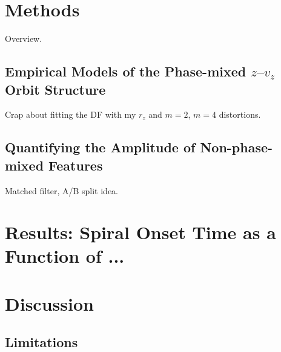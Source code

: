 

\section{Methods} \label{sec:methods}

Overview.

\subsection{Empirical Models of the Phase-mixed $z$--$v_z$ Orbit Structure}
\label{sec:zvz-structure}

Crap about fitting the DF with my $r_z$ and $m=2$, $m=4$ distortions.


\subsection{Quantifying the Amplitude of Non-phase-mixed Features}
\label{sec:residuals}

Matched filter, A/B split idea.


\section{Results: Spiral Onset Time as a Function of ...}
\label{sec:results}


\section{Discussion} \label{sec:discussion}

\subsection{Limitations}
\label{sec:limitations}


